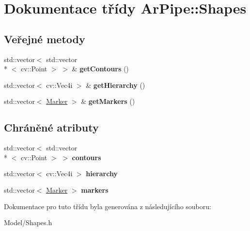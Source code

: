 \hypertarget{class_ar_pipe_1_1_shapes}{\section{Dokumentace třídy Ar\-Pipe\-:\-:Shapes}
\label{d0/db7/class_ar_pipe_1_1_shapes}
}
\subsection*{Veřejné metody}
\begin{DoxyCompactItemize}
\item 
\hypertarget{class_ar_pipe_1_1_shapes_ae21c9a2c3484f9a72d45306314839a5d}{std\-::vector$<$ std\-::vector\\*
$<$ cv\-::\-Point $>$ $>$ \& {\bfseries get\-Contours} ()}\label{d0/db7/class_ar_pipe_1_1_shapes_ae21c9a2c3484f9a72d45306314839a5d}

\item 
\hypertarget{class_ar_pipe_1_1_shapes_adc073e4c1fb75f3846538376f6e2fbea}{std\-::vector$<$ cv\-::\-Vec4i $>$ \& {\bfseries get\-Hierarchy} ()}\label{d0/db7/class_ar_pipe_1_1_shapes_adc073e4c1fb75f3846538376f6e2fbea}

\item 
\hypertarget{class_ar_pipe_1_1_shapes_a7b781881afb34d5b8cb2e42809549814}{std\-::vector$<$ \hyperlink{class_ar_pipe_1_1_marker}{Marker} $>$ \& {\bfseries get\-Markers} ()}\label{d0/db7/class_ar_pipe_1_1_shapes_a7b781881afb34d5b8cb2e42809549814}

\end{DoxyCompactItemize}
\subsection*{Chráněné atributy}
\begin{DoxyCompactItemize}
\item 
\hypertarget{class_ar_pipe_1_1_shapes_a0d17027098bad1d733ab955cc9cbe82d}{std\-::vector$<$ std\-::vector\\*
$<$ cv\-::\-Point $>$ $>$ {\bfseries contours}}\label{d0/db7/class_ar_pipe_1_1_shapes_a0d17027098bad1d733ab955cc9cbe82d}

\item 
\hypertarget{class_ar_pipe_1_1_shapes_af157d96b7cf4de75f130a0247d94ab50}{std\-::vector$<$ cv\-::\-Vec4i $>$ {\bfseries hierarchy}}\label{d0/db7/class_ar_pipe_1_1_shapes_af157d96b7cf4de75f130a0247d94ab50}

\item 
\hypertarget{class_ar_pipe_1_1_shapes_ac8d350477cc3a1ba0ad402efdd50cac4}{std\-::vector$<$ \hyperlink{class_ar_pipe_1_1_marker}{Marker} $>$ {\bfseries markers}}\label{d0/db7/class_ar_pipe_1_1_shapes_ac8d350477cc3a1ba0ad402efdd50cac4}

\end{DoxyCompactItemize}


Dokumentace pro tuto třídu byla generována z následujícího souboru\-:\begin{DoxyCompactItemize}
\item 
Model/Shapes.\-h\end{DoxyCompactItemize}
